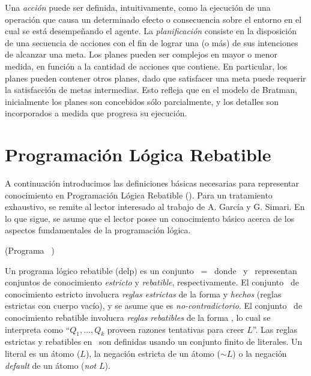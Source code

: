  Una \textit{acción} puede ser definida, intuitivamente, como la
 ejecución de una operación que causa un determinado efecto o
 consecuencia sobre el entorno en el cual se está desempeñando el
 agente.
 La \textit{planificación} consiste  en la disposición de una secuencia
 de acciones con el fin de lograr una (o más) de sus intenciones de
 alcanzar una meta.
 Los planes pueden ser complejos en mayor o menor medida, en función a
 la cantidad de acciones que contiene.
 En  particular, los planes pueden contener otros planes, dado que
 satisfacer una meta puede requerir la satisfacción de metas
 intermedias.
 Esto refleja que en  el modelo de Bratman, inicialmente los planes son
 concebidos sólo parcialmente,  y los detalles son incorporados a
 medida que progresa su ejecución.

\section{Programación Lógica Rebatible}
\label{sec:programacion_logica_rebatible}
 
 A continuación introducimos las definiciones básicas necesarias para
 representar conocimiento en Programación Lógica Rebatible (\DLP). Para
 un tratamiento exhaustivo, se remite al lector interesado al trabajo
 de A. García y G. Simari\cite{delp04}.  En lo que sigue, se asume que
 el lector posee un conocimiento básico acerca de los aspectos
 fundamentales de la programación lógica.

 \begin{definicion}(Programa \DLP\ \PP)
 \label{def:programa_delp}
 
 Un programa lógico rebatible (delp) es un conjunto \PP\ = \SD\ donde
 \SSet\ y \DD\ representan conjuntos de conocimiento \textit{estricto}
 y \textit{rebatible}, respectivamente. El conjunto \SSet\ de
 conocimiento estricto involucra \textit{reglas estrictas} de la forma
  y \textit{hechos} (reglas estrictas con
 cuerpo vacío), y se asume que es \textit{no-contradictorio}.  El
 conjunto \DD\ de conocimiento rebatible involucra \textit{reglas
 rebatibles} de la forma  , lo cual se
 interpreta como ``$Q_1,\ldots,Q_k$ proveen razones tentativas  para
 creer $L$''. Las reglas estrictas y rebatibles en \DLP\ son definidas
 usando un conjunto  finito de literales. Un literal es un átomo ($L$),
 la negación estricta de un átomo ($\sim L$) o  la negación
 \textit{default} de un átomo (\textit{not} $L$).
 
 \end{definicion}
 
